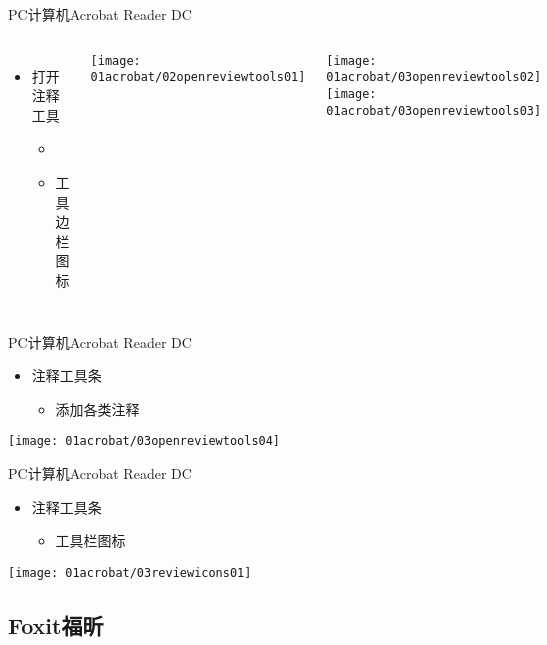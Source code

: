 \documentclass[fontset = none, t, aspectratio=169]{ctexbeamer}
\begin{document}
\begin{frame}{PC计算机}{Acrobat Reader DC}
  \begin{columns}[T]
    \begin{itemize}
    \item 打开注释工具
      \begin{itemize}
      \item {}
      \item 工具边栏图标
      \end{itemize}
    \end{itemize}
    \begin{center}
      \texttt{[image: 01acrobat/02openreviewtools01]}
    \end{center}    
    \texttt{[image: 01acrobat/03openreviewtools02]}\qquad
    \texttt{[image: 01acrobat/03openreviewtools03]}
  \end{columns}
\end{frame}

\begin{frame}{PC计算机}{Acrobat Reader DC}
  \begin{itemize}
  \item 注释工具条
    \begin{itemize}
    \item 添加各类注释
    \end{itemize}
  \end{itemize}
  \begin{center}
    \texttt{[image: 01acrobat/03openreviewtools04]}
  \end{center}
\end{frame}

\begin{frame}{PC计算机}{Acrobat Reader DC}
  \begin{itemize}
  \item 注释工具条
    \begin{itemize}
    \item 工具栏图标
    \end{itemize}
  \end{itemize}
  \begin{center}
    \texttt{[image: 01acrobat/03reviewicons01]}
  \end{center}
\end{frame}

\subsection{Foxit福昕}
\end{document}

